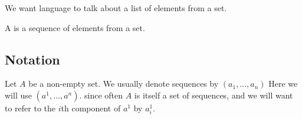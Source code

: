 

We want language to talk about
a list of elements from a set.


A  is a sequence
of elements from a set.

\subsection{Notation}

Let $A$ be a non-empty set.
We usually denote sequences
by $(a_1, \dots, a_n)$
Here we will use
$(a^1, \dots, a^n)$.
since often $A$ is itself
a set of sequences,
and we will want to refer
to the $i$th component of
$a^1$ by $a^1_i$.


